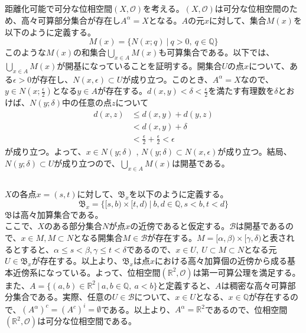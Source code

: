 \documentclass{jsarticle}
\begin{document}
\subsection{}
距離化可能で可分な位相空間$(X,\mathcal{O})$を考える。$(X,\mathcal{O})$は可分な位相空間のため、高々可算部分集合が存在し$A^\alpha=X$となる。$A$の元$x$に対して、集合$M(x)$を以下のように定義する。
\[M(x)=\{N(x;q)\ |\ q>0,\ q\in\mathbb{Q}\}\]
このような$M(x)$の和集合$\bigcup_{x\in A}M(x)$も可算集合である。以下では、$\bigcup_{x\in A}M(x)$が開基になっていることを証明する。開集合$U$の点$x$について、ある$\epsilon>0$が存在し、$N(x,\epsilon)\subset U$が成り立つ。このとき、$A^\alpha=X$なので、$y\in N(x;\frac{\epsilon}{2})$となる$y\in A$が存在する。$d(x,y)<\delta<\frac{\epsilon}{2}$を満たす有理数を$\delta$とおけば、$N(y;\delta)$中の任意の点$z$について
\begin{align*}
d(x,z)&\leq d(x,y)+d(y,z)\\
&<d(x,y)+\delta\\
&<\frac{\epsilon}{2}+\frac{\epsilon}{2}<\epsilon
\end{align*}
が成り立つ。よって、$x\in N(y;\delta)$ , $N(y;\delta)\subset N(x,\epsilon)$が成り立つ。結局、$N(y;\delta)\subset U$が成り立つので、$\bigcup_{x\in A}M(x)$は開基である。


\subsection{}
\subsubsection{}
$X$の各点$x=(s,t)$に対して、$\mathfrak{B}_x$を以下のように定義する。
\[\mathfrak{B}_x=\{[s,b)\times[t,d)\ |\ b,d\in\mathbb{Q}, s<b, t<d\}\]
$\mathfrak{B}$は高々加算集合である。\\
ここで、$X$のある部分集合$N$が点$x$の近傍であると仮定する。$\mathcal{B}$は開基であるので、$x\in M, M\subset N$となる開集合$M\in\mathcal{B}$が存在する。$M=[\alpha,\beta)\times[\gamma,\delta)$と表されるとすると、$\alpha\leq s<\beta,\gamma\leq t<\delta$であるので、$x\in U,\ U\subset M\subset N$となる元$U\in\mathfrak{B}_x$が存在する。以上より、$\mathfrak{B}_x$は点$x$における高々加算個の近傍から成る基本近傍系になっている。よって、位相空間$(\mathbb{R}^2, \mathcal{O})$は第一可算公理を満足する。\\
また、$A=\{(a,b)\in\mathbb{R}^2\ |\ a,b\in\mathbb{Q},\ a<b\}$と定義すると、$A$は稠密な高々可算部分集合である。実際、任意の$U\in\mathcal{B}$について、$x\in U$となる、$x\in \mathbb{Q}$が存在するので、$(A^\alpha)^c=(A^c)^i=\emptyset$である。以上より、$A^\alpha=\mathbb{R}^2$であるので、位相空間$(\mathbb{R}^2, \mathcal{O})$は可分な位相空間である。
\end{document}
